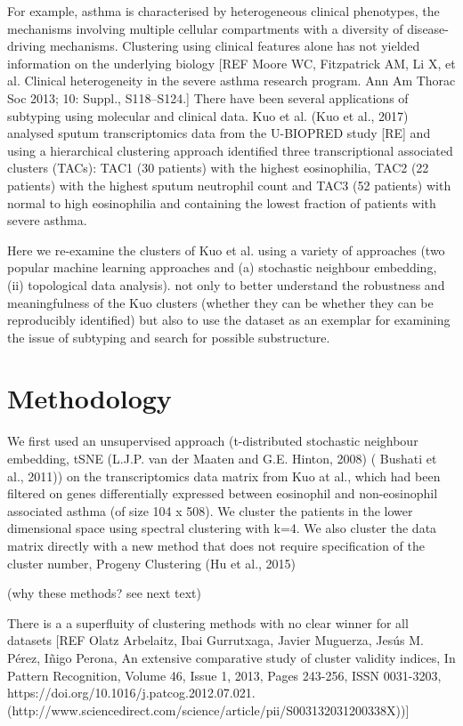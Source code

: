 \documentclass[9pt,twocolumn,twoside]{pnas-new}
\begin{document}
For example, asthma is characterised by heterogeneous clinical phenotypes, the  mechanisms involving multiple cellular compartments with a diversity of disease-driving mechanisms. Clustering using clinical features alone has not yielded information on the underlying biology [REF Moore WC, Fitzpatrick AM, Li X, et al. Clinical heterogeneity in the severe asthma research program. Ann Am Thorac Soc 2013; 10: Suppl., S118–S124.] There have been several applications of subtyping using molecular and clinical data. Kuo et al.  (Kuo et al., 2017) analysed sputum transcriptomics data from the U-BIOPRED study [RE] and using a hierarchical clustering approach identified three transcriptional associated clusters (TACs): TAC1 (30 patients) with the highest eosinophilia, TAC2 (22 patients) with the highest sputum neutrophil count and TAC3 (52 patients) with normal to high eosinophilia and containing the lowest fraction of patients with severe asthma. 

Here we re-examine the clusters of Kuo et al. using a variety of approaches (two popular machine learning approaches and (a) stochastic neighbour embedding, (ii) topological data analysis). not only to better understand the robustness and meaningfulness of the Kuo clusters (whether they can be whether they can be reproducibly identified) but also to use the dataset as an exemplar for examining the issue of subtyping and search for possible substructure. 

\section*{Methodology}

We first used an unsupervised approach (t-distributed stochastic neighbour embedding, tSNE (L.J.P. van der Maaten and G.E. Hinton, 2008) (  Bushati et al., 2011)) on the transcriptomics data matrix from Kuo at al., which had been filtered on genes differentially expressed between eosinophil and non-eosinophil associated asthma (of size 104 x 508). We cluster the patients in the lower dimensional space using spectral clustering with k=4. We also cluster the data matrix directly with a new method that does not require specification of the cluster number, Progeny Clustering (Hu et al., 2015)

(why these methods? see next text)

There is a a superfluity of clustering methods with no clear winner for all datasets [REF Olatz Arbelaitz, Ibai Gurrutxaga, Javier Muguerza, Jesús M. Pérez, Iñigo Perona, An extensive comparative study of cluster validity indices, In Pattern Recognition, Volume 46, Issue 1, 2013, Pages 243-256, ISSN 0031-3203, https://doi.org/10.1016/j.patcog.2012.07.021.
(http://www.sciencedirect.com/science/article/pii/S003132031200338X))]
\end{document}
